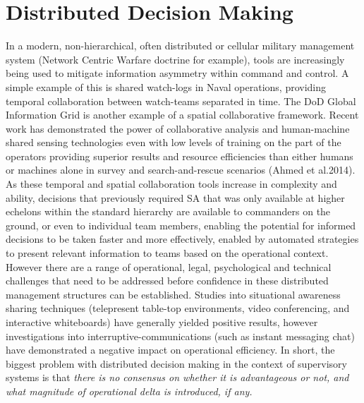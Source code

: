 \section{Distributed Decision Making}
In a modern, non-hierarchical, often distributed or cellular military management system (Network Centric Warfare doctrine for example), tools are increasingly being used to mitigate information asymmetry within command and control.
A simple example of this is shared watch-logs in Naval operations, providing temporal collaboration between watch-teams separated in time.
The DoD Global Information Grid is another example of a spatial collaborative framework.
Recent work has demonstrated the power of collaborative analysis and human-machine shared sensing technologies even with low levels of training on the part of the operators providing superior results and resource efficiencies than either humans or machines alone in survey and search-and-rescue scenarios (Ahmed et al.2014).
As these temporal and spatial collaboration tools increase in complexity and ability, decisions that previously required SA that was only available at higher echelons within the standard hierarchy are available to commanders on the ground, or even to individual team members, enabling the potential for informed decisions to be taken faster and more effectively, enabled by automated strategies to present relevant information to teams based on the operational context.
However there are a range of operational, legal, psychological and technical challenges that need to be addressed before confidence in these distributed management structures can be established.
Studies into situational awareness sharing techniques (telepresent table-top environments, video conferencing, and interactive whiteboards) have generally yielded positive results, however investigations into interruptive-communications (such as instant messaging chat) have demonstrated a negative impact on operational efficiency.
In short, the biggest problem with distributed decision making in the context of supervisory systems is that \textit{there is no consensus on whether it is advantageous or not, and what magnitude of operational delta is introduced, if any.}


